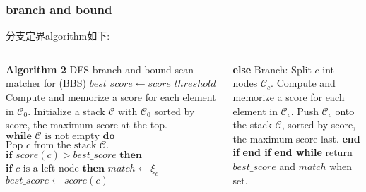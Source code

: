 \begin{frame}[fragile]
\frametitle{branch and bound}
分支定界algorithm如下:
\begin{columns}
	\begin{algorithmic}[1]
		\State \textbf{Algorithm 2} DFS branch and bound scan matcher for (BBS)
		\State $best\_score \leftarrow score\_threshold$
		\State Compute and memorize a score for each element in $\mathcal{C}_0$.
			   Initialize a stack $\mathcal{C}$ with $\mathcal{C}_0$ sorted by score,
			   the maximum score at the top.
		\State $\textbf{while } \mathcal{C } \text{ is not empty} \textbf{ do}$
		\State \quad $\text{Pop } c \text{ from the stack } \mathcal{C}.$
		\State \quad $\textbf{if } score(c) > best\_score \textbf{ then}$
		\State \qquad $\textbf{if } c \text{ is a left node } \textbf{then}$
		\State \qquad \quad $match \leftarrow \xi_c$
		\State \qquad \quad $best\_score \leftarrow score(c)$

		
	\end{algorithmic}
	
	\begin{algorithmic}[1]
		\State \qquad \textbf{else}
		\State \qquad \quad Branch: Split $c$ int nodes $\mathcal{C}_c$.
		\State \qquad \quad Compute and memorize a score for each element in $\mathcal{C}_c$.
		\State \qquad \quad Push $\mathcal{C}_c$ onto the stack $\mathcal{C}$, 
							sorted by score, the 
							\Statex \qquad \quad maximum score last.
		\State \qquad \textbf{end if}
		\State \quad \textbf{end if}
		\State \textbf{end while}
		\State return $best\_score $ and $match$ when set.
		
	\end{algorithmic}
\end{columns}
\end{frame}


